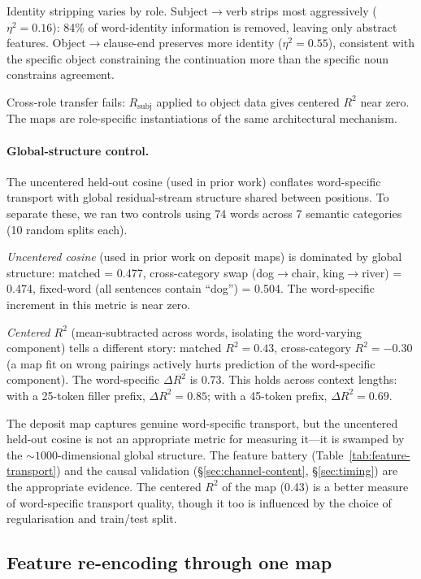 \documentclass[11pt,a4paper]{article}
\begin{document}
Identity stripping varies by role. Subject$\to$verb strips most aggressively ($\eta^2 =
0.16$): 84\% of word-identity information is removed, leaving only abstract features.
Object$\to$clause-end preserves more identity ($\eta^2 = 0.55$), consistent with the
specific object constraining the continuation more than the specific noun constrains
agreement.

Cross-role transfer fails: $R_\mathrm{subj}$ applied to object data gives centered $R^2$
near zero. The maps are role-specific instantiations of the same architectural mechanism.

\label{sec:global-control}
\paragraph{Global-structure control.}
The uncentered held-out cosine (used in prior work) conflates word-specific
transport with global residual-stream structure shared between positions. To separate these,
we ran two controls using 74 words across 7 semantic categories (10 random splits each).

\emph{Uncentered cosine} (used in prior work on deposit maps) is dominated by
global structure: matched = 0.477, cross-category swap (dog$\to$chair, king$\to$river) =
0.474, fixed-word (all sentences contain ``dog'') = 0.504. The word-specific increment in
this metric is near zero.

\emph{Centered $R^2$} (mean-subtracted across words, isolating the word-varying component)
tells a different story: matched $R^2 = 0.43$, cross-category $R^2 = -0.30$ (a map fit on
wrong pairings actively hurts prediction of the word-specific component). The word-specific
$\Delta R^2$ is 0.73. This holds across context lengths: with a 25-token filler prefix,
$\Delta R^2 = 0.85$; with a 45-token prefix, $\Delta R^2 = 0.69$.

The deposit map captures genuine word-specific transport, but the uncentered held-out cosine
is not an appropriate metric for measuring it---it is swamped by the ${\sim}1000$-dimensional
global structure. The feature battery (Table~\ref{tab:feature-transport}) and the causal
validation (\S\ref{sec:channel-content}, \S\ref{sec:timing}) are the appropriate evidence.
The centered $R^2$ of the map (0.43) is a better measure of word-specific transport quality,
though it too is influenced by the choice of regularisation and train/test split.

\subsection{Feature re-encoding through one map}
\end{document}
